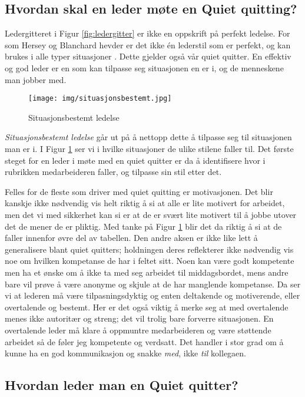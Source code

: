 \documentclass[a4paper, 12pt]{article}  %
\begin{document}
\subsection{Hvordan skal en leder møte en Quiet quitting?}

Ledergitteret i Figur \ref{fig:ledergitter} er ikke en oppskrift på perfekt ledelse. 
For som Hersey og Blanchard hevder er det ikke én lederstil som er perfekt, og kan brukes i alle typer situasjoner \parencite{ledelse}. 
Dette gjelder også vår quiet quitter. 
En effektiv og god leder er en som kan tilpasse seg situasjonen en er i, og de menneskene man jobber med. 

\begin{figure}[H]
  \centering
  \texttt{[image: img/situasjonsbestemt.jpg]}
  \caption{Situasjonsbestemt ledelse \parencite{ledelse}}
  \label{fig:situasjon}
\end{figure}

\emph{Situasjonsbestemt ledelse} går ut på å nettopp dette å tilpasse seg til situasjonen man er i. 
I Figur \ref{fig:situasjon} ser vi i hvilke situasjoner de ulike stilene faller til. 
Det første steget for en leder i møte med en quiet quitter er da å identifisere hvor i rubrikken medarbeideren faller, og tilpasse sin stil etter det. 

Felles for de fleste som driver med quiet quitting er motivasjonen. 
Det blir kanskje ikke nødvendig vis helt riktig å si at alle er lite motivert for arbeidet, men det vi med sikkerhet kan si er at de er svært lite motivert til å jobbe utover det de mener de er pliktig.
Med tanke på Figur \ref{fig:situasjon} blir det da riktig å si at de faller innenfor øvre del av tabellen.
Den andre aksen er ikke like lett å generalisere blant quiet quitters; holdningen deres reflekterer ikke nødvendig vis noe om hvilken kompetanse de har i feltet sitt. 
Noen kan være godt kompetente men ha et ønske om å ikke ta med seg arbeidet til middagsbordet, mens andre bare vil prøve å være anonyme og skjule at de har manglende kompetanse.
Da ser vi at lederen må være tilpasningsdyktig og enten deltakende og motiverende, eller overtalende og bestemt. 
Her er det også viktig å merke seg at med overtalende menes ikke autoritær og streng; det vil trolig bare forverre situasjonen.
En overtalende leder må klare å oppmuntre medarbeideren og være støttende arbeidet så de føler jeg kompetente og verdsatt.
Det handler i stor grad om å kunne ha en god kommunikasjon og snakke \emph{med}, ikke \emph{til} kollegaen.


\subsection{Hvordan leder man en Quiet quitter?}
\end{document}
